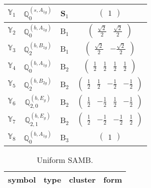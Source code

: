 \documentclass[fleqn,10pt,landscape]{article}
\begin{document}
\begin{itemize}
\begin{center}
\begin{longtable}{c|c|c|c}
$ \mathbb{Y}_{1} $ & $\mathbb{Q}_{0}^{(s,A_{1g})}$ & S$_{1}$ & $\begin{pmatrix} 1 \end{pmatrix}$ \\ \hline
$ \mathbb{Y}_{2} $ & $\mathbb{Q}_{0}^{(b,A_{1g})}$ & B$_{1}$ & $\begin{pmatrix} \frac{\sqrt{2}}{2} & \frac{\sqrt{2}}{2} \end{pmatrix}$ \\
$ \mathbb{Y}_{3} $ & $\mathbb{Q}_{2}^{(b,B_{1g})}$ & B$_{1}$ & $\begin{pmatrix} \frac{\sqrt{2}}{2} & - \frac{\sqrt{2}}{2} \end{pmatrix}$ \\ \hline
$ \mathbb{Y}_{4} $ & $\mathbb{Q}_{0}^{(b,A_{1g})}$ & B$_{2}$ & $\begin{pmatrix} \frac{1}{2} & \frac{1}{2} & \frac{1}{2} & \frac{1}{2} \end{pmatrix}$ \\
$ \mathbb{Y}_{5} $ & $\mathbb{Q}_{2}^{(b,B_{2g})}$ & B$_{2}$ & $\begin{pmatrix} \frac{1}{2} & \frac{1}{2} & - \frac{1}{2} & - \frac{1}{2} \end{pmatrix}$ \\
$ \mathbb{Y}_{6} $ & $\mathbb{Q}_{2,0}^{(b,E_{g})}$ & B$_{2}$ & $\begin{pmatrix} \frac{1}{2} & - \frac{1}{2} & \frac{1}{2} & - \frac{1}{2} \end{pmatrix}$ \\
$ \mathbb{Y}_{7} $ & $\mathbb{Q}_{2,1}^{(b,E_{g})}$ & B$_{2}$ & $\begin{pmatrix} \frac{1}{2} & - \frac{1}{2} & - \frac{1}{2} & \frac{1}{2} \end{pmatrix}$ \\ \hline
$ \mathbb{Y}_{8} $ & $\mathbb{Q}_{0}^{(b,A_{1g})}$ & B$_{3}$ & $\begin{pmatrix} 1 \end{pmatrix}$ \\
\end{longtable}
\end{center}
\begin{center}
\renewcommand{\arraystretch}{1.3}
\begin{longtable}{c|c|c|c}
\caption{Uniform SAMB.}
 \\
 \hline \hline
symbol & type & cluster & form \\ \hline \endfirsthead


\end{longtable}
\end{center}
\end{itemize}
\end{document}

